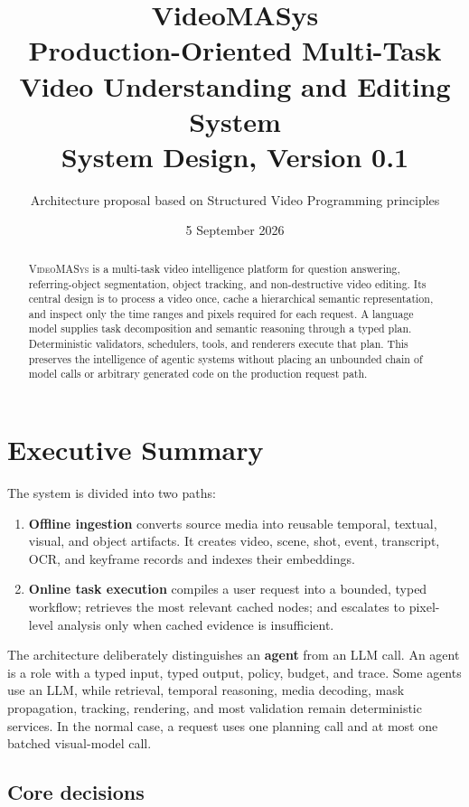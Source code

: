 \documentclass[11pt]{article}
\title{\vspace{-12mm}\textbf{VideoMASys}\\
\large Production-Oriented Multi-Task Video Understanding and Editing System\\[2mm]
\normalsize System Design, Version 0.1}
\author{Architecture proposal based on Structured Video Programming principles}
\date{5 September 2026}
\newcommand{\system}{\textsc{VideoMASys}}
\newcommand{\term}[1]{\textbf{#1}}
\begin{document}
\maketitle

\begin{abstract}
\system{} is a multi-task video intelligence platform for question answering,
referring-object segmentation, object tracking, and non-destructive video
editing. Its central design is to process a video once, cache a hierarchical
semantic representation, and inspect only the time ranges and pixels required
for each request. A language model supplies task decomposition and semantic
reasoning through a typed plan. Deterministic validators, schedulers, tools, and
renderers execute that plan. This preserves the intelligence of agentic systems
without placing an unbounded chain of model calls or arbitrary generated code on
the production request path.
\end{abstract}

\tableofcontents
\newpage

\section{Executive Summary}

The system is divided into two paths:

\begin{enumerate}
  \item \term{Offline ingestion} converts source media into reusable temporal,
  textual, visual, and object artifacts. It creates video, scene, shot, event,
  transcript, OCR, and keyframe records and indexes their embeddings.
  \item \term{Online task execution} compiles a user request into a bounded,
  typed workflow; retrieves the most relevant cached nodes; and escalates to
  pixel-level analysis only when cached evidence is insufficient.
\end{enumerate}

The architecture deliberately distinguishes an \term{agent} from an LLM call.
An agent is a role with a typed input, typed output, policy, budget, and trace.
Some agents use an LLM, while retrieval, temporal reasoning, media decoding,
mask propagation, tracking, rendering, and most validation remain deterministic
services. In the normal case, a request uses one planning call and at most one
batched visual-model call.

\subsection{Core decisions}
\end{document}
